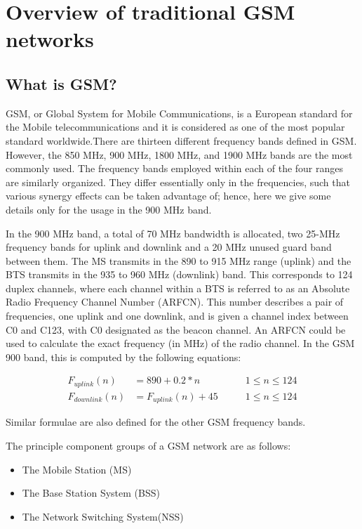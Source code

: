 \chapter{Overview of traditional GSM networks}

\section{What is GSM?}
GSM, or Global System for Mobile Communications, is a European standard for
the Mobile telecommunications and it is considered as one of the most popular
standard worldwide.There are thirteen different frequency bands defined in GSM.
However, the 850 MHz, 900 MHz, 1800 MHz, and 1900 MHz bands are the most
commonly used. The frequency bands employed within each of the four ranges are
similarly organized. They differ essentially only in the frequencies, such that
various synergy effects can be taken advantage of; hence, here we give some
details only for the usage in the 900 MHz band.


In the 900 MHz band, a total of 70 MHz bandwidth is allocated, two 25-MHz
frequency bands for uplink and downlink and a 20 MHz unused guard band between
them. The MS transmits in the 890 to 915 MHz range (uplink) and the BTS
transmits in the 935 to 960 MHz (downlink) band. This corresponds to 124 duplex
channels, where each channel within a BTS is referred to as an Absolute Radio
Frequency Channel Number (ARFCN). This number describes a pair of frequencies,
one uplink and one downlink, and is given a channel index between C0 and C123,
with C0 designated as the beacon channel. An ARFCN could be used to calculate
the exact frequency (in MHz) of the radio channel. In the GSM 900 band, this is
computed by the following equations:

\begin{align}
F_{uplink}(n) &= 890 + 0.2*n \qquad & 1\leq{}n\leq{}124 \nonumber\\
F_{downlink}(n) &= F_{uplink}(n) + 45 \qquad & 1\leq{}n\leq{}124 \nonumber
\end{align}

Similar formulae are also defined for the other GSM frequency bands.


The principle component groups of a GSM network are as follows:
\begin{itemize}
\item The Mobile Station (MS)
\item The Base Station System (BSS)
\item The Network Switching System(NSS)
\end{itemize}


